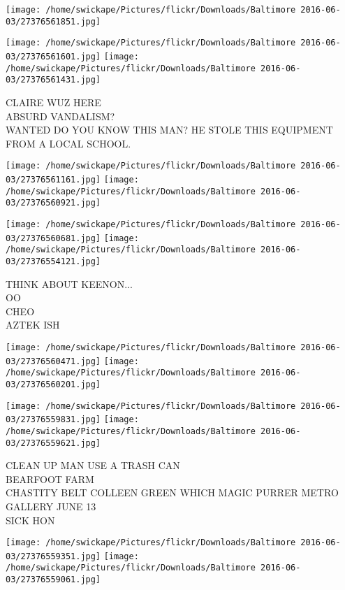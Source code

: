 \documentclass[10pt,letterpaper]{article}
\begin{document}
\texttt{[image: /home/swickape/Pictures/flickr/Downloads/Baltimore 2016-06-03/27376561851.jpg]}

\vspace{0.25in}
\texttt{[image: /home/swickape/Pictures/flickr/Downloads/Baltimore 2016-06-03/27376561601.jpg]}
\texttt{[image: /home/swickape/Pictures/flickr/Downloads/Baltimore 2016-06-03/27376561431.jpg]}

CLAIRE WUZ HERE\\
ABSURD VANDALISM?\\
WANTED DO YOU KNOW THIS MAN?  HE STOLE THIS EQUIPMENT FROM A LOCAL SCHOOL.\\
\pagebreak

\texttt{[image: /home/swickape/Pictures/flickr/Downloads/Baltimore 2016-06-03/27376561161.jpg]}
\texttt{[image: /home/swickape/Pictures/flickr/Downloads/Baltimore 2016-06-03/27376560921.jpg]}

\texttt{[image: /home/swickape/Pictures/flickr/Downloads/Baltimore 2016-06-03/27376560681.jpg]}
\texttt{[image: /home/swickape/Pictures/flickr/Downloads/Baltimore 2016-06-03/27376554121.jpg]}

THINK ABOUT KEENON...\\
OO\\
CHEO\\
AZTEK ISH\\
\pagebreak

\texttt{[image: /home/swickape/Pictures/flickr/Downloads/Baltimore 2016-06-03/27376560471.jpg]}
\texttt{[image: /home/swickape/Pictures/flickr/Downloads/Baltimore 2016-06-03/27376560201.jpg]}

\texttt{[image: /home/swickape/Pictures/flickr/Downloads/Baltimore 2016-06-03/27376559831.jpg]}
\texttt{[image: /home/swickape/Pictures/flickr/Downloads/Baltimore 2016-06-03/27376559621.jpg]}

CLEAN UP MAN USE A TRASH CAN\\
BEARFOOT FARM\\
CHASTITY BELT COLLEEN GREEN WHICH MAGIC PURRER METRO GALLERY JUNE 13\\
SICK HON\\
\pagebreak

\texttt{[image: /home/swickape/Pictures/flickr/Downloads/Baltimore 2016-06-03/27376559351.jpg]}
\texttt{[image: /home/swickape/Pictures/flickr/Downloads/Baltimore 2016-06-03/27376559061.jpg]}
\end{document}
